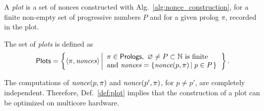 %

A \emph{plot} is a set of nonces constructed with Alg.~\ref{alg:nonce_construction},
for a finite non-empty set of progressive numbers $P$ and
for a given prolog $\pi$, recorded in the plot.
%
\begin{definition}[Plot]\label{def:plot}
  The set of \emph{plots} is defined as
  \[
  {\mathsf{Plots}}=\left\{\left<\pi,{\mathit{nonces}}\right>\left|\begin{array}{l}
  \pi\in{\mathsf{Prologs}},\ \varnothing\not=P\subset\mathbb{N}\text{ is finite}\\
  \text{and }{\mathit{nonces}}=\left\{{\mathit{nonce}}(p,\pi)\left|\;p\in P\right.\right\}
  \end{array}\right.\right\}.
  \]
\end{definition}
%
The computations of ${\mathit{nonce}}(p,\pi)$ and ${\mathit{nonce}}(p',\pi)$, for $p\not=p'$,
are completely independent. Therefore, Def.~\ref{def:plot}
implies that the construction of a plot can be optimized on
multicore hardware.
